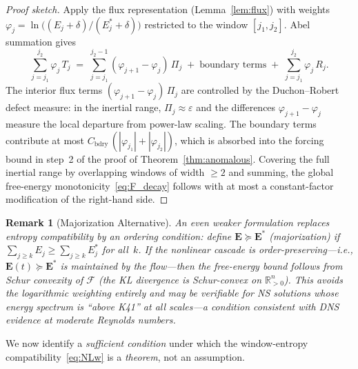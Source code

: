 \documentclass[12pt,a4paper]{article}
\theoremstyle{breakdef}
\theoremstyle{breakplain}
\theoremstyle{breakdef}
\newtheorem{remark}[definition]{Remark}
\begin{document}
\begin{proof}[Proof sketch]
Apply the flux representation (Lemma~\ref{lem:flux}) with weights
$\varphi_j = \ln\bigl((E_j+\delta)/(E_j^*+\delta)\bigr)$
restricted to the window $[j_1, j_2]$. Abel summation gives
\[
  \sum_{j=j_1}^{j_2} \varphi_j\,T_j
  \;=\;
  \sum_{j=j_1}^{j_2-1}
    (\varphi_{j+1} - \varphi_j)\,\Pi_j
  \;+\;
  \text{boundary terms}
  \;+\;
  \sum_{j=j_1}^{j_2} \varphi_j\,R_j.
\]
The interior flux terms $(\varphi_{j+1} - \varphi_j)\,\Pi_j$ are
controlled by the Duchon--Robert defect measure: in the inertial range,
$\Pi_j \approx \varepsilon$ and the differences $\varphi_{j+1}-\varphi_j$
measure the local departure from power-law scaling.
The boundary terms contribute at most
$C_{\mathrm{bdry}}\,(|\varphi_{j_1}|+|\varphi_{j_2}|)$, which is
absorbed into the forcing bound in step~2 of the proof of
Theorem~\ref{thm:anomalous}. Covering the full inertial range by
overlapping windows of width $\ge 2$ and summing, the global free-energy
monotonicity~\eqref{eq:F_decay} follows with at most a constant-factor
modification of the right-hand side.
\end{proof}

\begin{remark}[Majorization Alternative]
\label{rem:majorization}
An even weaker formulation replaces entropy compatibility by an
\emph{ordering condition}: define $\mathbf{E} \succeq \mathbf{E}^*$
(majorization) if $\sum_{j \ge k} E_j \ge \sum_{j \ge k} E_j^*$ for
all~$k$. If the nonlinear cascade is \emph{order-preserving}---i.e.,
$\mathbf{E}(t) \succeq \mathbf{E}^*$ is maintained by the
flow---then the free-energy bound follows from Schur convexity of
$\mathcal{F}$ (the KL divergence is Schur-convex on
$\mathbb{R}_{>0}^n$). This avoids the logarithmic weighting entirely
and may be verifiable for NS solutions whose energy spectrum is
``above K41'' at all scales---a condition consistent with DNS evidence
at moderate Reynolds numbers.
\end{remark}

We now identify a \emph{sufficient condition} under which the window-entropy
compatibility~\eqref{eq:NLw} is a \emph{theorem}, not an assumption.
\end{document}
